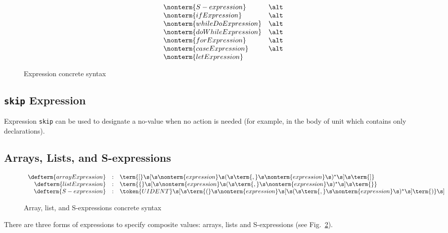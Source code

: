 \begin{figure}[h]
\[\begin{array}{rcll}
                                  &   & \nonterm{S-expression}&\alt\\
                                  &   & \nonterm{ifExpression}&\alt\\
                                  &   & \nonterm{whileDoExpression}&\alt\\
                                  &   & \nonterm{doWhileExpression}&\alt\\
                                  &   & \nonterm{forExpression}&\alt\\
                                  &   & \nonterm{caseExpression}&\alt\\
                                  &   & \nonterm{letExpression}&
    \end{array}
  \]
  \caption{Expression concrete syntax}
  \label{expressions}
\end{figure}

\FloatBarrier
\subsection{\texttt{skip} Expression}

Expression \lstinline|skip| can be used to designate a no-value when no action is needed (for example, in the body of unit which contains only declarations).

\subsection{Arrays, Lists, and S-expressions}

\begin{figure}[h]
  \[
    \begin{array}{rcl}
      \defterm{arrayExpression} & : & \term{[}\s[\s\nonterm{expression}\s(\s\term{,}\s\nonterm{expression}\s)^\star\s]\s\term{]}\\
      \defterm{listExpression}  & : & \term{\{}\s[\s\nonterm{expression}\s(\s\term{,}\s\nonterm{expression}\s)^\star\s]\s\term{\}}\\
      \defterm{S-expression}    & : & \token{UIDENT}\s[\s\term{(}\s\nonterm{expression}\s[\s(\s\term{,}\s\nonterm{expression}\s)^\star\s]\term{)}\s]
    \end{array}
  \]
  \caption{Array, list, and S-expressions concrete syntax}  
  \label{composite_expressions}
\end{figure}

There are three forms of expressions to specify composite values: arrays, lists and S-expressions (see Fig.~\ref{composite_expressions}).

